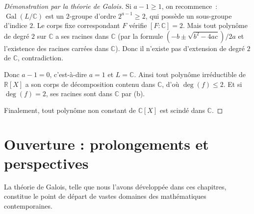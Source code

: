 \documentclass[12pt,a4paper,openany]{book}
\theoremstyle{definition}
\newcommand{\R}{\mathbb{R}}
\newcommand{\C}{\mathbb{C}}
\newcommand{\Gal}{\operatorname{Gal}}
\renewcommand{\deg}{\operatorname{deg}}
\begin{document}
\begin{proof}[Démonstration par la théorie de Galois]
Si $a - 1 \geq 1$, on recommence~: $\Gal(L/\C)$ est un $2$-groupe d'ordre
$2^{a-1} \geq 2$, qui possède un sous-groupe d'indice $2$. Le corps fixe
correspondant $F$ vérifie $[F:\C] = 2$. Mais tout polynôme de degré $2$
sur $\C$ a ses racines dans $\C$ (par la formule $(-b \pm \sqrt{b^2 - 4ac})/2a$
et l'existence des racines carrées dans $\C$). Donc il n'existe pas
d'extension de degré $2$ de $\C$, contradiction.

Donc $a - 1 = 0$, c'est-à-dire $a = 1$ et $L = \C$. Ainsi tout polynôme
irréductible de $\R[X]$ a son corps de décomposition contenu dans $\C$, d'où
$\deg(f) \leq 2$. Et si $\deg(f) = 2$, ses racines sont dans $\C$ par (b).

Finalement, tout polynôme non constant de $\C[X]$ est scindé dans $\C$.
\end{proof}

\section{Ouverture : prolongements et perspectives}\label{sec:perspectives}

La théorie de Galois, telle que nous l'avons développée dans ces chapitres,
constitue le point de départ de vastes domaines des mathématiques
contemporaines.
\end{document}
